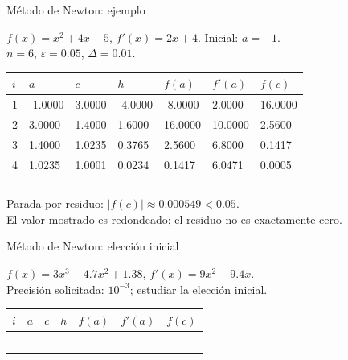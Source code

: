 \documentclass[original_version/main.tex]{subfiles}
\begin{document}
\begin{frame}[t]{Método de Newton: ejemplo}
\begin{minipage}[t][17mm]{\textwidth}\small
$f(x)=x^2+4x-5$, $f'(x)=2x+4$. Inicial: $a=-1$.\\
$n=6$, $\varepsilon=0.05$, $\Delta=0.01$.
\end{minipage}\begingroup\scriptsize\setlength{\tabcolsep}{2pt}
\begin{center}\begin{tabular}{|C{.04\textwidth}|*{6}{C{.135\textwidth}|}}\hline
$i$&$a$&$c$&$h$&$f(a)$&$f'(a)$&$f(c)$\\\hline
\rule{0pt}{5mm}1&-1.0000&3.0000&-4.0000&-8.0000&2.0000&16.0000\\\hline
\rule{0pt}{5mm}2&3.0000&1.4000&1.6000&16.0000&10.0000&2.5600\\\hline
\rule{0pt}{5mm}3&1.4000&1.0235&0.3765&2.5600&6.8000&0.1417\\\hline
\rule{0pt}{5mm}4&1.0235&1.0001&0.0234&0.1417&6.0471&0.0005\\\hline
\rule{0pt}{5mm}&&&&&&\\\hline
\rule{0pt}{5mm}&&&&&&\\\hline
\end{tabular}\end{center}\endgroup\small Parada por residuo: $|f(c)|\approx0.000549<0.05$.\\El valor mostrado es redondeado; el residuo no es exactamente cero.
\end{frame}
\begin{frame}[t]{Método de Newton: elección inicial}
\begin{minipage}[t][17mm]{\textwidth}\small
$f(x)=3x^3-4.7x^2+1.38$, $f'(x)=9x^2-9.4x$.\\
Precisión solicitada: $10^{-3}$; estudiar la elección inicial.
\end{minipage}\begingroup\scriptsize\setlength{\tabcolsep}{2pt}
\begin{center}\begin{tabular}{|C{.04\textwidth}|*{6}{C{.135\textwidth}|}}\hline
$i$&$a$&$c$&$h$&$f(a)$&$f'(a)$&$f(c)$\\\hline
\rule{0pt}{5mm}&&&&&&\\\hline
\rule{0pt}{5mm}&&&&&&\\\hline
\rule{0pt}{5mm}&&&&&&\\\hline
\rule{0pt}{5mm}&&&&&&\\\hline
\rule{0pt}{5mm}&&&&&&\\\hline
\end{tabular}\end{center}\endgroup
\end{frame}
\end{document}
